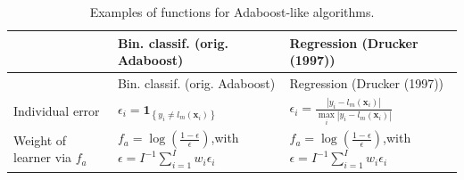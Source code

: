 \documentclass[]{krantz}
\theoremstyle{definition}
\theoremstyle{definition}
\theoremstyle{definition}
\theoremstyle{remark}
\begin{document}
\begin{longtable}[]{@{}lll@{}}
\caption{\label{tab:adaboost} Examples of functions for Adaboost-like
algorithms.}\tabularnewline
\toprule
\begin{minipage}[b]{0.30\columnwidth}\raggedright
\strut
\end{minipage} & \begin{minipage}[b]{0.30\columnwidth}\raggedright
Bin. classif. (orig. Adaboost)\strut
\end{minipage} & \begin{minipage}[b]{0.30\columnwidth}\raggedright
Regression (Drucker (1997))\strut
\end{minipage}\tabularnewline
\midrule
\endfirsthead
\toprule
\begin{minipage}[b]{0.30\columnwidth}\raggedright
\strut
\end{minipage} & \begin{minipage}[b]{0.30\columnwidth}\raggedright
Bin. classif. (orig. Adaboost)\strut
\end{minipage} & \begin{minipage}[b]{0.30\columnwidth}\raggedright
Regression (Drucker (1997))\strut
\end{minipage}\tabularnewline
\midrule
\endhead
\begin{minipage}[t]{0.30\columnwidth}\raggedright
Individual error\strut
\end{minipage} & \begin{minipage}[t]{0.30\columnwidth}\raggedright
\(\epsilon_i=\textbf{1}_{\left\{y_i\neq l_m(\textbf{x}_i) \right\}}\)\strut
\end{minipage} & \begin{minipage}[t]{0.30\columnwidth}\raggedright
\(\epsilon_i=\frac{|y_i- l_m(\textbf{x}_i)|}{\underset{i}{\max}|y_i- l_m(\textbf{x}_i)|}\)\strut
\end{minipage}\tabularnewline
\begin{minipage}[t]{0.30\columnwidth}\raggedright
Weight of learner via \(f_a\)\strut
\end{minipage} & \begin{minipage}[t]{0.30\columnwidth}\raggedright
\(f_a=\log\left(\frac{1-\epsilon}{\epsilon} \right)\),with
\(\epsilon=I^{-1}\sum_{i=1}^Iw_i \epsilon_i\)\strut
\end{minipage} & \begin{minipage}[t]{0.30\columnwidth}\raggedright
\(f_a=\log\left(\frac{1-\epsilon}{\epsilon} \right)\),with
\(\epsilon=I^{-1}\sum_{i=1}^Iw_i \epsilon_i\)\strut
\end{minipage}\tabularnewline

\end{longtable}
\end{document}
